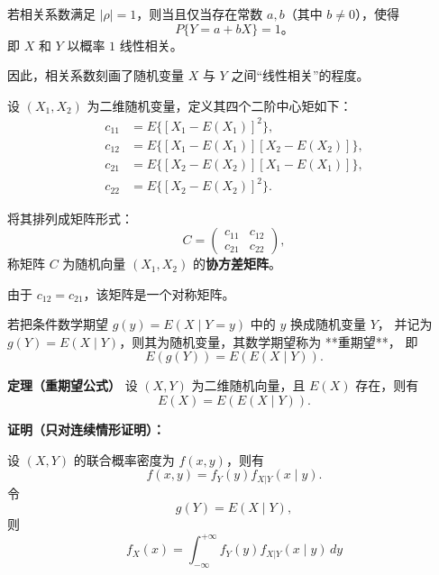 \begin{proposition}
若相关系数满足 $|\rho| = 1$，则当且仅当存在常数 $a,b$（其中 $b \ne 0$），使得
\[
P\{Y = a + bX\} = 1。
\]
即 $X$ 和 $Y$ 以概率 $1$ 线性相关。

因此，相关系数刻画了随机变量 $X$ 与 $Y$ 之间“线性相关”的程度。
\end{proposition}
\begin{definition}
设 $(X_1, X_2)$ 为二维随机变量，定义其四个二阶中心矩如下：
\[
\begin{aligned}
c_{11} &= E\{[X_1 - E(X_1)]^2\}, \\[3pt]
c_{12} &= E\{[X_1 - E(X_1)][X_2 - E(X_2)]\}, \\[3pt]
c_{21} &= E\{[X_2 - E(X_2)][X_1 - E(X_1)]\}, \\[3pt]
c_{22} &= E\{[X_2 - E(X_2)]^2\}.
\end{aligned}
\]

将其排列成矩阵形式：
\[
C =
\begin{pmatrix}
c_{11} & c_{12} \\[3pt]
c_{21} & c_{22}
\end{pmatrix},
\]
称矩阵 $C$ 为随机向量 $(X_1, X_2)$ 的\textbf{协方差矩阵}。

由于 $c_{12} = c_{21}$，该矩阵是一个对称矩阵。
\end{definition}


若把条件数学期望 $g(y) = E(X \mid Y = y)$ 中的 $y$ 换成随机变量 $Y$，
并记为 $g(Y) = E(X \mid Y)$，则其为随机变量，其数学期望称为 **重期望**，
即
\[
E(g(Y)) = E(E(X \mid Y)).
\]

\textbf{定理（重期望公式）}  
设 $(X,Y)$ 为二维随机向量，且 $E(X)$ 存在，则有
\[
E(X) = E(E(X \mid Y)).
\]

\textbf{证明（只对连续情形证明）：}

设 $(X,Y)$ 的联合概率密度为 $f(x,y)$，则有
\[
f(x,y) = f_Y(y) f_{X|Y}(x \mid y).
\]
令
\[
g(Y) = E(X \mid Y),
\]
则
\[
f_X(x) = \int_{-\infty}^{+\infty} f_Y(y) f_{X|Y}(x \mid y)\, dy
\]

